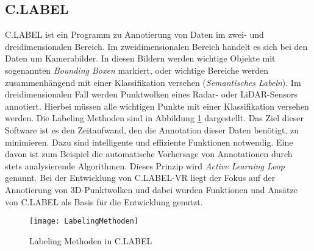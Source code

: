\subsection{C.LABEL}
\label{sec:C.LABEL}
C.LABEL ist ein Programm zu Annotierung von Daten im zwei- und dreidimensionalen Bereich. Im zweidimensionalen Bereich handelt es sich bei den Daten um Kamerabilder. In diesen Bildern werden wichtige Objekte mit sogenannten \textit{Bounding Boxen} markiert, oder wichtige Bereiche werden zusammenhängend mit einer Klassifikation versehen (\textit{Semantisches Labeln}). Im dreidimensionalen Fall werden Punktwolken eines Radar- oder LiDAR-Sensors annotiert. Hierbei müssen alle wichtigen Punkte mit einer Klassifikation versehen werden. Die Labeling Methoden sind in Abbildung \ref{fig:LabelingMethoden} dargestellt. Das Ziel dieser Software ist es den Zeitaufwand, den die Annotation dieser Daten benötigt, zu minimieren. Dazu sind intelligente und effiziente Funktionen notwendig. Eine davon ist zum Beispiel die automatische Vorhersage von Annotationen durch stets analysierende Algorithmen. Dieses Prinzip wird \textit{Active Learning Loop} genannt. Bei der Entwicklung von C.LABEL-VR liegt der Fokus auf der Annotierung von 3D-Punktwolken und dabei wurden Funktionen und Ansätze von C.LABEL als Basis für die Entwicklung genutzt.

\begin{figure}%
    \texttt{[image: LabelingMethoden]}
    \caption{Labeling Methoden in C.LABEL}
	\label{fig:LabelingMethoden}
\end{figure}